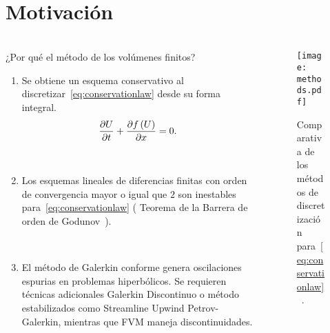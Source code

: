 \section{Motivación}

\begin{frame}
	\frametitle{\secname}
	\begin{columns}
		\begin{column}{.48\paperwidth}
			\begin{alertblock}{¿Por qué el método de los volúmenes finitos?}
				\begin{enumerate}
					\item

					      Se obtiene un { esquema
							      conservativo} al
					      discretizar~\eqref{eq:conservationlaw} desde su forma integral.
					      \begin{equation}\label{eq:conservationlaw}
						      \diffp{U}{t}+
						      \diffp{f\left(U\right)}{x}=
						      0.
					      \end{equation}

					      \

					\item

					      Los esquemas lineales de diferencias finitas con
					      orden de convergencia mayor o igual que $2$ son
					      inestables para~\eqref{eq:conservationlaw}
					      ({ Teorema de la
						      Barrera de orden de Godunov}~\cite{Godunov1959}).

					      \

					\item

					      El método de Galerkin conforme genera
						      { oscilaciones
							      espurias} en problemas hiperbólicos.
					      Se requieren técnicas adicionales Galerkin
					      Discontinuo o método estabilizados como Streamline
					      Upwind Petrov-Galerkin, mientras que FVM maneja
					      discontinuidades.
				\end{enumerate}
			\end{alertblock}
		\end{column}
		\begin{column}{.48\paperwidth}
			\begin{figure}[ht!]
				\centering
				\texttt{[image: methods.pdf]}
				\caption{Comparativa de los métodos de discretización
					para~\eqref{eq:conservationlaw}~\cite{Milbradt2008}.}
			\end{figure}
		\end{column}
	\end{columns}
\end{frame}
